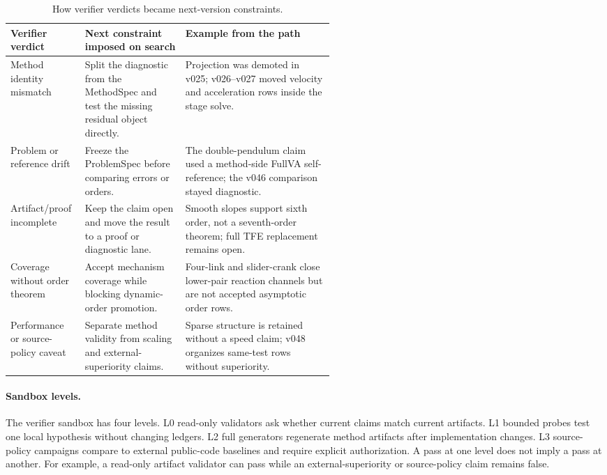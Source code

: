 \documentclass[10pt]{article}
\newcommand{\tfe}{TFE}
\begin{document}
\begin{table}[!htbp]
\centering
\caption{How verifier verdicts became next-version constraints.}
\label{tab:verdict-to-constraint}
\small
\begin{tabularx}{\linewidth}{p{0.23\linewidth}p{0.31\linewidth}Y}
\toprule
\textbf{Verifier verdict} & \textbf{Next constraint imposed on search} &
\textbf{Example from the path} \\
\midrule
Method identity mismatch & Split the diagnostic from the MethodSpec and test
the missing residual object directly. & Projection was demoted in v025; v026--v027
moved velocity and acceleration rows inside the stage solve. \\
Problem or reference drift & Freeze the ProblemSpec before comparing errors or
orders. & The double-pendulum claim used a method-side FullVA self-reference;
the v046 comparison stayed diagnostic. \\
Artifact/proof incomplete & Keep the claim open and move the result to a proof
or diagnostic lane. & Smooth slopes support sixth order, not a seventh-order
theorem; full \tfe{} replacement remains open. \\
Coverage without order theorem & Accept mechanism coverage while blocking
dynamic-order promotion. & Four-link and slider-crank close lower-pair reaction
channels but are not accepted asymptotic order rows. \\
Performance or source-policy caveat & Separate method validity from scaling and
external-superiority claims. & Sparse structure is retained without a speed
claim; v048 organizes same-test rows without superiority. \\
\bottomrule
\end{tabularx}
\end{table}

\paragraph{Sandbox levels.}
The verifier sandbox has four levels. L0 read-only validators ask whether
current claims match current artifacts. L1 bounded probes test one local
hypothesis without changing ledgers. L2 full generators regenerate method
artifacts after implementation changes. L3 source-policy campaigns compare to
external public-code baselines and require explicit authorization. A pass at
one level does not imply a pass at another. For example, a read-only artifact
validator can pass while an external-superiority or source-policy claim remains
false.
\end{document}
